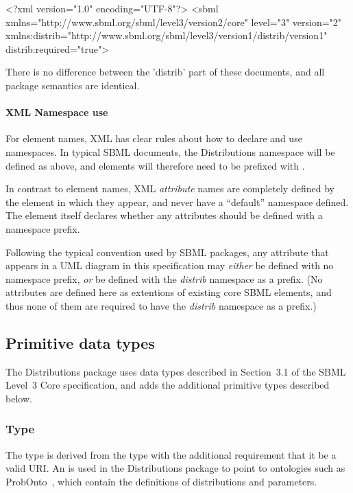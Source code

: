 \documentclass[draftspec]{sbmlpkgspec}
\newcommand{\fixttspace}{\hspace*{1pt}}
\newcommand{\sbmlthreecore}{SBML Level~3 Core\xspace}
\newcommand{\distrib}{Distributions\xspace}
\begin{document}
\begin{example}
<?xml version="1.0" encoding="UTF-8"?>
<sbml xmlns="http://www.sbml.org/sbml/level3/version2/core" level="3" version="2"
      xmlns:distrib="http://www.sbml.org/sbml/level3/version1/distrib/version1"
      distrib:required="true">
\end{example}

There is no difference between the 'distrib' part of these documents, and all package semantics are identical.

\paragraph{XML Namespace use}

For element names, XML has clear rules about how to declare and use namespaces.  In typical SBML documents, the \distrib namespace will be defined as above, and elements will therefore need to be prefixed with .

In contrast to element names, XML \emph{attribute} names are completely defined by the element in which they appear, and never have a ``default'' namespace defined. The element itself declares whether any attributes should be defined with a namespace prefix.

Following the typical convention used by SBML packages, any attribute that appears in a UML diagram in this specification may \emph{either} be defined with no namespace prefix, \emph{or} be defined with the \emph{distrib} namespace as a prefix.  (No attributes are defined here as extentions of existing core SBML elements, and thus none of them are required to have the \emph{distrib} namespace as a prefix.)


\subsection{Primitive data types}
\label{new-primitive-types}

The \distrib package uses data types described in Section~3.1 of the \sbmlthreecore specification, and adds the additional primitive types described below.

\subsubsection{Type \fixttspace{}}
\label{sec:primtype-externalref}

The type  is derived from the type  with the additional requirement that it be a valid URI.  An  is used in the \distrib package to point to ontologies such as ProbOnto~\citep{swat:2016}, which contain the definitions of distributions and parameters.
\end{document}
